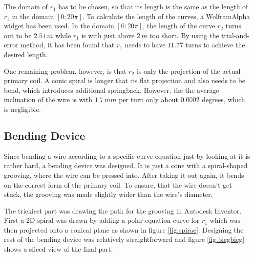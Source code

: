 The domain of \(r_1\) has to be chosen, so that its length is the same as the length of \(r_1\) in the domain \([0:20\pi]\). To calculate the length of the curves, a WolframAlpha widget has been used. In the domain \([0:20\pi]\), the length of the curve \(r_2\) turns out to be \(2.51\,m\) while \(r_1\) is with just above \(2\,m\) too short. By using the trial-and-error method, it has been found that \(r_1\) needs to have \(11.77\) turns to achieve the desired length.

One remaining problem, however, is that \(r_2\) is only the projection of the actual primary coil. A conic spiral is longer that its flat projection and also needs to be bend, which introduces additional springback. However, the the average inclination of the wire is with \(1.7\,mm\) per turn only about \(0.0002\) degrees, which is negligible.

\subsection{Bending Device}

Since bending a wire according to a specific curve equation just by looking at it is rather hard, a bending device was designed. It is just a cone with a spiral-shaped grooving, where the wire can be pressed into. After taking it out again, it bends on the correct form of the primary coil. To ensure, that the wire doesn't get stuck, the grooving was made slightly wider than the wire's diameter.

The trickiest part was drawing the path for the grooving in Autodesk Inventor. First a 2D spiral was drawn by adding a polar equation curve for \(r_1\) which was then projected onto a conical plane as shown in figure \ref{fig:spirae}. Designing the rest of the bending device was relatively straightforward and figure \ref{fig:biegbieg} shows a sliced view of the final part. %

